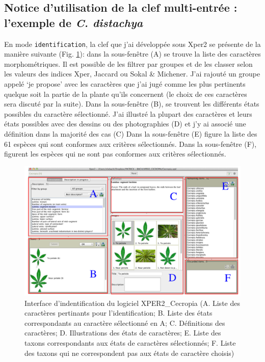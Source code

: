 \documentclass[a4paper]{article}
\theoremstyle{definition}
\theoremstyle{definition}
\theoremstyle{definition}
\theoremstyle{remark}
\begin{document}
\subsection{\texorpdfstring{Notice d'utilisation de la clef multi-entrée
: l'exemple de \emph{C.
distachya}}{Notice d'utilisation de la clef multi-entrée : l'exemple de C. distachya}}\label{notice-dutilisation-de-la-clef-multi-entree-lexemple-de-c.-distachya}

En mode \texttt{identification}, la clef que j'ai développée sous Xper2
se présente de la manière suivante (Fig. \ref{fig:fig5}): dans la
sous-fenêtre (A) se trouve la liste des caractères morphométriques. Il
est possible de les filtrer par groupes et de les classer selon les
valeurs des indices Xper, Jaccard ou Sokal \& Michener. J'ai rajouté un
groupe appelé `je propose' avec les caractères que j'ai jugé comme les
plus pertinents quelque soit la partie de la plante qu'ils concernent
(le choix de ces caractères sera discuté par la suite). Dans la
sous-fenêtre (B), se trouvent les différents états possibles du
caractère sélectionné. J'ai illustré la plupart des caractères et leurs
états possibles avec des dessins ou des photographies (D) et j'y ai
associé une définition dans la majorité des cas (C) Dans la sous-fenêtre
(E) figure la liste des 61 espèces qui sont conformes aux critères
sélectionnés. Dans la sous-fenêtre (F), figurent les espèces qui ne sont
pas conformes aux critères sélectionnés.








\begin{figure}[H]

{\centering \includegraphics[width=0.9\linewidth]{figure/fig5} 

}

\caption{Interface d'indentification du logiciel XPER2\_Cecropia (A.
Liste des caractères pertinants pour l'identification; B. Liste des
états correspondants au caractère sélectionné en A; C. Définitions des
caractères; D. Illustrations des états de caractères; E. Liste des
taxons correspondants aux états de caractères sélectionnés; F. Liste des
taxons qui ne correspondent pas aux états de caractère choisis)}\label{fig:fig5}
\end{figure}
\end{document}
